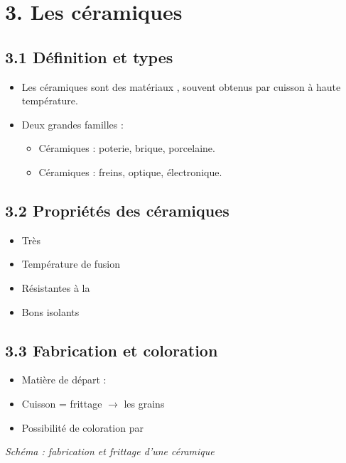 \documentclass[a4paper,12pt]{article}
\newif\ifprof
\newcommand{\proftext}[1]{\ifprof {\textcolor{blue}{#1}} \fi}
\begin{document}
\section*{3. Les céramiques}
\subsection*{3.1 Définition et types}
\begin{itemize}
    \item Les céramiques sont des matériaux \dotfillrule{0.15cm}, souvent obtenus par cuisson à haute température.
    \proftext{(réponse : inorganiques, non métalliques)}
    \item Deux grandes familles :
    \begin{itemize}
        \item Céramiques \dotfillrule{0.15cm} : poterie, brique, porcelaine.
        \proftext{(réponse : traditionnelles)}
        \item Céramiques \dotfillrule{0.15cm} : freins, optique, électronique.
        \proftext{(réponse : techniques ou industrielles)}
    \end{itemize}
\end{itemize}

\subsection*{3.2 Propriétés des céramiques}
\begin{multicols}{2}
\begin{itemize}
    \item Très \dotfillrule{0.15cm}
    \item Température de fusion \dotfillrule{0.15cm}
    \item Résistantes à la \dotfillrule{0.15cm}
    \item Bons isolants \dotfillrule{0.15cm}
\end{itemize}
\proftext{\begin{itemize}
    \item (réponses : rigides, >2000°C, corrosion, thermiques ou électriques)
\end{itemize}}
\end{multicols}

\subsection*{3.3 Fabrication et coloration}
\begin{itemize}
    \item Matière de départ : \dotfillrule{0.15cm} \proftext{(poudre)}
    \item Cuisson = frittage $\rightarrow$ les grains \dotfillrule{0.15cm}
    \proftext{(réponse : se soudent sans passer par une phase fondue)}
    \item Possibilité de coloration par \dotfillrule{0.15cm} \proftext{(oxydes métalliques)}
\end{itemize}

\vspace{1cm}
\textit{Schéma : fabrication et frittage d’une céramique}

\vspace{4cm}
\end{document}
